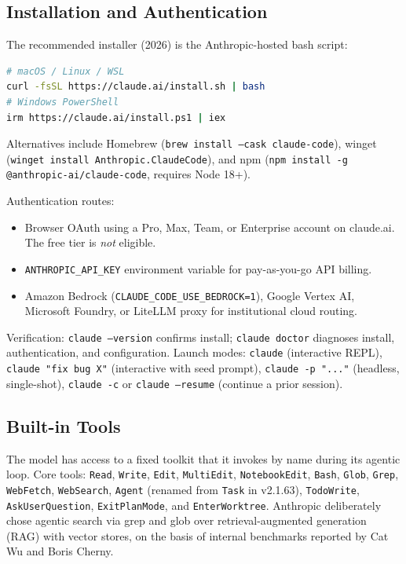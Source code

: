 \documentclass[11pt]{article}
\begin{document}
\subsection{Installation and Authentication}

The recommended installer (2026) is the Anthropic-hosted bash script:
\begin{lstlisting}[language=bash]
# macOS / Linux / WSL
curl -fsSL https://claude.ai/install.sh | bash
# Windows PowerShell
irm https://claude.ai/install.ps1 | iex
\end{lstlisting}

Alternatives include Homebrew (\texttt{brew install --cask claude-code}), winget (\texttt{winget install Anthropic.ClaudeCode}), and npm (\texttt{npm install -g @anthropic-ai/claude-code}, requires Node 18+).

Authentication routes:
\begin{itemize}[leftmargin=*,nosep]
    \item Browser OAuth using a Pro, Max, Team, or Enterprise account on claude.ai. The free tier is \emph{not} eligible.
    \item \texttt{ANTHROPIC\_API\_KEY} environment variable for pay-as-you-go API billing.
    \item Amazon Bedrock (\texttt{CLAUDE\_CODE\_USE\_BEDROCK=1}), Google Vertex AI, Microsoft Foundry, or LiteLLM proxy for institutional cloud routing.
\end{itemize}

Verification: \texttt{claude --version} confirms install; \texttt{claude doctor} diagnoses install, authentication, and configuration. Launch modes: \texttt{claude} (interactive REPL), \texttt{claude "fix bug X"} (interactive with seed prompt), \texttt{claude -p "..."} (headless, single-shot), \texttt{claude -c} or \texttt{claude --resume} (continue a prior session).

\subsection{Built-in Tools}

The model has access to a fixed toolkit that it invokes by name during its agentic loop. Core tools: \texttt{Read}, \texttt{Write}, \texttt{Edit}, \texttt{MultiEdit}, \texttt{NotebookEdit}, \texttt{Bash}, \texttt{Glob}, \texttt{Grep}, \texttt{WebFetch}, \texttt{WebSearch}, \texttt{Agent} (renamed from \texttt{Task} in v2.1.63), \texttt{TodoWrite}, \texttt{AskUserQuestion}, \texttt{ExitPlanMode}, and \texttt{EnterWorktree}. Anthropic deliberately chose agentic search via grep and glob over retrieval-augmented generation (RAG) with vector stores, on the basis of internal benchmarks reported by Cat Wu and Boris Cherny.
\end{document}
